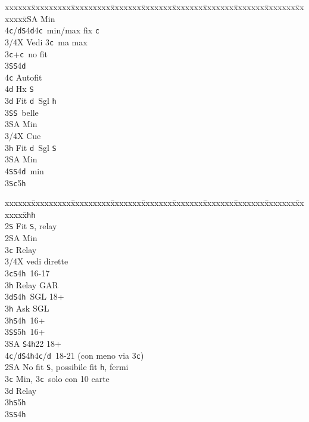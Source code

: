 \documentclass[a4paper,italian]{article}
\newcommand{\BS}{\small{\texttt{S}}}
\newcommand{\BC}{\small{\texttt{c}}}
\newcommand{\BD}{\small{\texttt{d}}}
\newcommand{\BH}{\small{\texttt{h}}}
\newenvironment{bidtable}
{\begin{tabbing}

    xxxxxx\=xxxxxxxxx\=xxxxxxxxx\=xxxxxxx\=xxxxxxx\=xxxxxxx\=xxxxxxx\=xxxxxxx\=xxxxxxx\=xxxxxxx\=\kill}
{\end{tabbing} }%
\begin{document}
\begin{multicols}{2}
\begin{bidtable}
        3\small{SA} \> Min\\
        4\BC/\BD {}\BS 4\BD 4\BC\ min/max fix \BC \-\-\\
        3/4X \> Vedi 3\BC\ ma max\-\\
        3\BC {}+\BC\ no fit\+\\
        3\BS{}\BS 4\BD \+\\
        4\BC \> Autofit\\
        4\BD \> Hx \BS \-\-\\
        3\BD \> Fit \BD\ Sgl \BH \+\\
        3\BS {}\BS\ belle\\
        3\small{SA} \> Min\\
        3/4X \> Cue\-\\
        3\BH \> Fit \BD\ Sgl \BS \+\\
        3\small{SA} \> Min\\
        4\BS {}\BS 4\BD\ min\-\\
        3\BS {}\BC 5\BH \-\\
    \end{bidtable}
    \columnbreak
    \begin{bidtable}
        2\BH {}\BH \+\\
        2\BS \> Fit \BS , relay\+\\
        2\small{SA} \> Min\+\\
        3\BC \> Relay\+\\
        3/4X \> vedi dirette\-\-\\
        3\BC {}\BS 4\BH\ 16-17\+\\
        3\BH \> Relay GAR\-\\
        3\BD {}\BS 4\BH\ SGL 18+\+\\
        3\BH \> Ask SGL\-\\
        3\BH {}\BS 4\BH\ 16+\\
        3\BS {}\BS 5\BH\ 16+\\
        3\small{SA} \BS 4\BH 22 18+\\
        4\BC/\BD {}\BS 4\BH 4\BC/\BD\ 18-21 (con meno via 3\BC )\-\\
        2\small{SA} \> No fit \BS , possibile fit \BH , fermi\+\\
        3\BC \> Min, 3\BC\ solo con 10 carte\+\\
        3\BD \> Relay\+\\
        3\BH {}\BS 5\BH \\
        3\BS {}\BS 4\BH \\

\end{bidtable}
\end{multicols}
\end{document}
